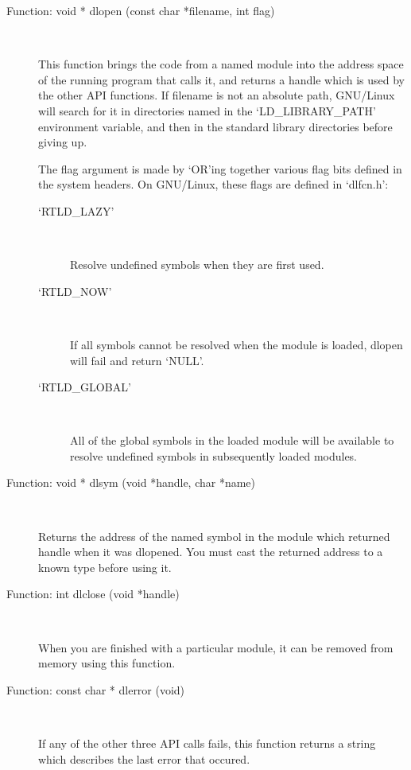 \begin{description}
\item[Function: void * dlopen (const char *filename, int flag)]
\

This function brings the code from a named module into the address space 
of the running program that calls it, and returns a handle which 
is used by the other API functions. If filename is not an absolute path,
GNU/Linux will search for it in directories named in 
the `LD\_{}LIBRARY\_{}PATH' environment variable, and then in the 
standard library directories before giving up.

    The flag argument is made by `OR'ing together various flag bits defined in the system headers. On GNU/Linux, these flags are defined in `dlfcn.h': 

\begin{description}
\item[`RTLD\_{}LAZY']
\

    Resolve undefined symbols when they are first used.

\item[`RTLD\_{}NOW']
\

    If all symbols cannot be resolved when the module is loaded, dlopen will fail and return `NULL'.

\item[`RTLD\_{}GLOBAL']
\

    All of the global symbols in the loaded module will be available to resolve undefined symbols in subsequently loaded modules.
\end{description}

\item[Function: void * dlsym (void *handle, char *name)]
\

    Returns the address of the named symbol in the module which returned handle when it was dlopened. You must cast the returned address to a known type before using it. 

\item [Function: int dlclose (void *handle)]
\

    When you are finished with a particular module, it can be removed from memory using this function. 

\item[Function: const char * dlerror (void)]
\

    If any of the other three API calls fails, this function returns a string which describes the last error that occured. 

\end{description}

